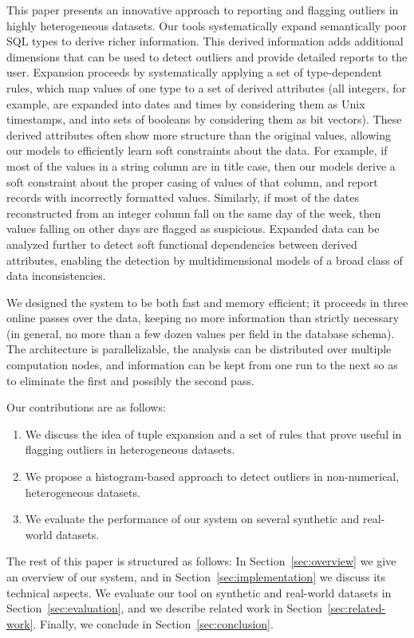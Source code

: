 This paper presents an innovative approach to reporting and flagging outliers in highly heterogeneous datasets. Our tools systematically expand semantically poor SQL types to derive richer information. This derived information adds additional dimensions that can be used to detect outliers and provide detailed reports to the user. Expansion proceeds by systematically applying a set of type-dependent rules, which map values of one type to a set of derived attributes (all integers, for example, are expanded into dates and times by considering them as Unix timestamps, and into sets of booleans by considering them as bit vectors). These derived attributes often show more structure than the original values, allowing our models to efficiently learn soft constraints about the data. For example, if most of the values in a string column are in title case, then our models derive a soft constraint about the proper casing of values of that column, and report records with incorrectly formatted values. Similarly, if most of the dates reconstructed from an integer column fall on the same day of the week, then values falling on other days are flagged as suspicious. Expanded data can be analyzed further to detect soft functional dependencies between derived attributes, enabling the detection by multidimensional models of a broad class of data inconsistencies.

We designed the system to be both fast and memory efficient; it proceeds in three online passes over the data, keeping no more information than strictly necessary (in general, no more than a few dozen values per field in the database schema). The architecture is parallelizable, the analysis can be distributed over multiple computation nodes, and information can be kept from one run to the next so as to eliminate the first and possibly the second pass.

Our contributions are as follows:
\begin{enumerate}
\item We discuss the idea of tuple expansion and a set of rules that prove useful in flagging outliers in heterogeneous datasets.
\item We propose a histogram-based approach to detect outliers in non-numerical, heterogeneous datasets.
\item We evaluate the performance of our system on several synthetic and real-world datasets.
\end{enumerate}

The rest of this paper is structured as follows: In Section~\ref{sec:overview} we give an overview of our system, and in Section~\ref{sec:implementation} we discuss its technical aspects. We evaluate our tool on synthetic and real-world datasets in Section~\ref{sec:evaluation}, and we describe related work in Section~\ref{sec:related-work}. Finally, we conclude in Section~\ref{sec:conclusion}. %
